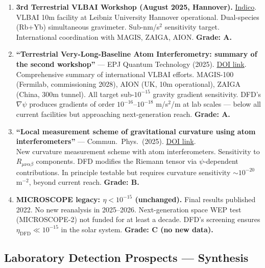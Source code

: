 \documentclass[11pt,a4paper]{article}
\begin{document}
\begin{enumerate}
\item \textbf{3rd Terrestrial VLBAI Workshop (August 2025, Hannover).} \href{https://indico.cern.ch/event/1522217/}{Indico}.\\
VLBAI 10m facility at Leibniz University Hannover operational. Dual-species (Rb+Yb) simultaneous gravimeter. Sub-nm/s$^2$ sensitivity target. International coordination with MAGIS, ZAIGA, AION. \textbf{Grade: A.}

\item \textbf{``Terrestrial Very-Long-Baseline Atom Interferometry: summary of the second workshop''} --- EPJ Quantum Technology (2025). \href{https://epjquantumtechnology.springeropen.com/articles/10.1140/epjqt/s40507-025-00344-3}{DOI link}.\\
Comprehensive summary of international VLBAI efforts. MAGIS-100 (Fermilab, commissioning 2028), AION (UK, 10m operational), ZAIGA (China, 300m tunnel). All target sub-$10^{-15}$ gravity gradient sensitivity. DFD's $\nabla\psi$ produces gradients of order $10^{-16}$--$10^{-18}$ m/s$^2$/m at lab scales --- below all current facilities but approaching next-generation reach. \textbf{Grade: A.}

\item \textbf{``Local measurement scheme of gravitational curvature using atom interferometers''} --- Commun.\ Phys.\ (2025). \href{https://www.nature.com/articles/s42005-025-02396-4}{DOI link}.\\
New curvature measurement scheme with atom interferometers. Sensitivity to $R_{\mu\nu\alpha\beta}$ components. DFD modifies the Riemann tensor via $\psi$-dependent contributions. In principle testable but requires curvature sensitivity $\sim 10^{-20}$ m$^{-2}$, beyond current reach. \textbf{Grade: B.}

\item \textbf{MICROSCOPE legacy: $\eta < 10^{-15}$ (unchanged).} Final results published 2022. No new reanalysis in 2025--2026. Next-generation space WEP test (MICROSCOPE-2) not funded for at least a decade. DFD's screening ensures $\eta_\mathrm{DFD} \ll 10^{-15}$ in the solar system. \textbf{Grade: C (no new data).}
\end{enumerate}

\subsection{Laboratory Detection Prospects --- Synthesis}
\end{document}

